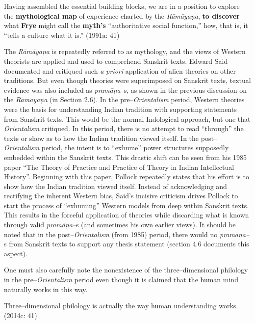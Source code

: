 \begin{myquote}
Having assembled the essential building blocks, we are in a position to explore the \textbf{mythological map} of experience charted by the \textit{Rāmāyaṇa}, \textbf{to discover} what \textbf{Frye} might call the \textbf{myth’s} “authoritative social function,” how, that is, it “tells a culture what it is.” (1991a: 41)
\end{myquote}

The \textit{Rāmāyaṇa }is repeatedly referred to as mythology, and the views of Western theorists are applied and used to comprehend Sanskrit texts. Edward Said documented and critiqued such \textit{a priori} application of alien theories on other traditions. But even though theories were superimposed on Sanskrit texts, textual evidence was also included as \textit{pramāṇa}–s, as shown in the previous discussion on the \textit{Rāmāyaṇa }(in Section 2.6). In the pre–\textit{Orientalism} period, Western theories were the basis for understanding Indian tradition with supporting statements from Sanskrit texts. This would be the normal Indological approach, but one that \textit{Orientalism }critiqued. In this period, there is no attempt to read “through” the texts or show as to how the Indian tradition viewed itself. In the post–\textit{Orientalism} period, the intent is to “exhume” power structures supposedly embedded within the Sanskrit texts. This drastic shift can be seen from his 1985 paper “The Theory of Practice and Practice of Theory in Indian Intellectual History”. Beginning with this paper, Pollock repeatedly states that his effort is to show how the Indian tradition viewed itself. Instead of acknowledging and rectifying the inherent Western bias, Said’s incisive criticism drives Pollock to start the process of “exhuming” Western models from deep within Sanskrit texts. This results in the forceful application of theories while discarding what is known through valid \textit{pramāṇa}–s (and sometimes his own earlier views). It should be noted that in the post–\textit{Orientalism} (from 1985) period, there would no\textit{ pramāṇa–}s from Sanskrit texts to support any thesis statement (section 4.6 documents this aspect).

One must also carefully note the nonexistence of the three–dimensional philology in the pre–\textit{Orientalism} period even though it is claimed that the human mind naturally works in this way.

\begin{myquote}
Three–dimensional philology is actually the way human understanding works. (2014c: 41)
\end{myquote}

